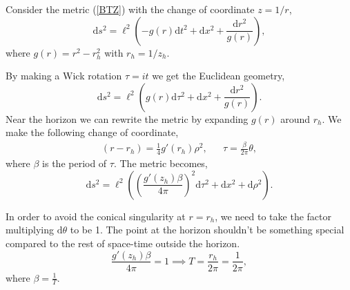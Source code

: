 Consider the metric (\ref{BTZ}) with the change of coordinate $z=1/r$,
\begin{equation}
    \text{d}s^2 = \ell^2\left(-g\left(r\right)\text{d}t^2+\text{d}x^2+\frac{\text{d}r^2}{g\left(r\right)}\right),
\end{equation}
where $g(r) = r^2-r_h^2$ with $r_h=1/z_h$.

By making a Wick rotation $\tau=it$ we get the Euclidean geometry,
\begin{equation}
    \text{d}s^2 = \ell^2\left(g\left(r\right)\text{d}\tau^2+\text{d}x^2+\frac{\text{d}r^2}{g\left(r\right)}\right).
\end{equation}
Near the horizon we can rewrite the metric by expanding $g(r)$ around $r_h$. We make the following change of coordinate,
\begin{align}
    (r-r_h)=\frac{1}{4}g'(r_h)\rho^2, && \tau = \frac{\beta}{2\pi}\theta,
\end{align}
where $\beta$ is the period of $\tau$. The metric becomes,
\begin{equation}
    \text{d}s^2 = \ell^2\left(\left(\frac{g'(z_h)\beta}{4\pi}\right)^2\text{d}\tau^2+\text{d}x^2+\text{d}\rho^2\right).
\end{equation}

In order to avoid the conical singularity at $r=r_h$, we need to take the factor multiplying $\text{d}\theta$ to be 1. The point at the horizon shouldn't be something special compared to the rest of space-time outside the horizon.
\begin{equation}
    \frac{g'(z_h)\beta}{4\pi} = 1\implies T = \frac{r_h}{2\pi} = \frac{1}{2\pi},
\end{equation}
where $\beta = \frac{1}{T}$.